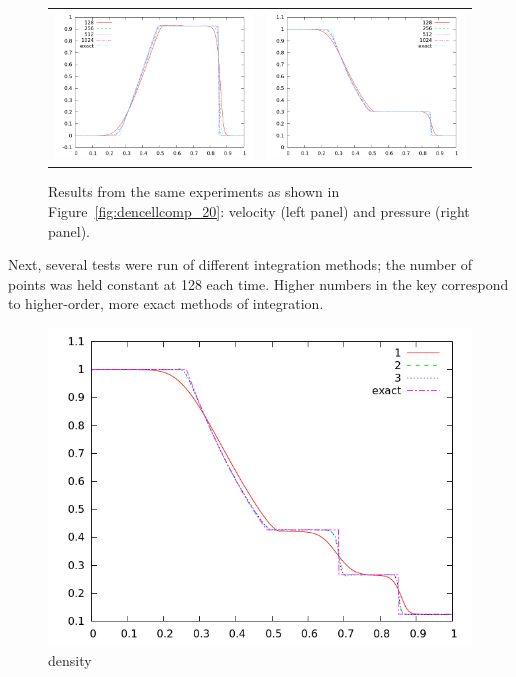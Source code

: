 \documentclass[10pt,preprint]{aastex}
\begin{document}
\begin{figure}
  \begin{center}
    \begin{tabular}{cc}
      \includegraphics[width=.475\textwidth]{velcellcomp_20} &
      \includegraphics[width=.475\textwidth]{prscellcomp_20}
    \end{tabular}
  \end{center}
  \caption{Results from the same experiments as shown in Figure~\ref{fig:dencellcomp_20}:
  velocity (left panel) and pressure (right panel).}
  \label{fig:pvcellcomp}
\end{figure}

    
Next, several tests were run of different integration methods; the number of points was held constant at 128 each time. Higher numbers in the key correspond to higher-order, more exact methods of integration. 

\begin{figure}[h]
  \begin{center}
    \includegraphics[width=.78\textwidth]{den128comp_20}
  \end{center}
  \caption{density}
\end{figure}
\end{document}
